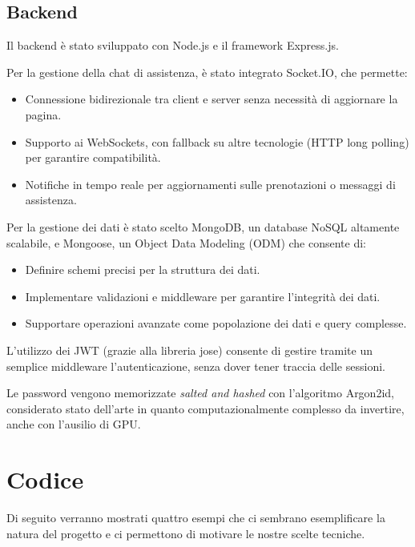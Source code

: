 \documentclass{report}
\begin{document}
\subsection{Backend}
\par Il backend è stato sviluppato con Node.js e il framework Express.js.
\par Per la gestione della chat di assistenza, è stato integrato Socket.IO, che permette:
\begin{itemize}
    \item Connessione bidirezionale tra client e server senza necessità di aggiornare la pagina.
    \item Supporto ai WebSockets, con fallback su altre tecnologie (HTTP long polling) per garantire compatibilità.
    \item Notifiche in tempo reale per aggiornamenti sulle prenotazioni o messaggi di assistenza.
\end{itemize}
\par Per la gestione dei dati è stato scelto MongoDB, un database NoSQL altamente scalabile, e Mongoose, un Object Data Modeling (ODM) che consente di:
\begin{itemize}
    \item Definire schemi precisi per la struttura dei dati.
    \item Implementare validazioni e middleware per garantire l'integrità dei dati.
    \item Supportare operazioni avanzate come popolazione dei dati e query complesse.
\end{itemize}
\par L'utilizzo dei JWT (grazie alla libreria jose)  consente di gestire tramite un semplice middleware l'autenticazione, senza dover tener traccia delle sessioni.
\par Le password vengono memorizzate \textit{salted and hashed} con l'algoritmo Argon2id\citep{rfc9106}, considerato stato dell'arte in quanto computazionalmente complesso da invertire, anche con l'ausilio di GPU.
\section{Codice}
\par Di seguito verranno mostrati quattro esempi che ci sembrano esemplificare la natura del progetto e ci permettono di motivare le nostre scelte tecniche.
\end{document}
